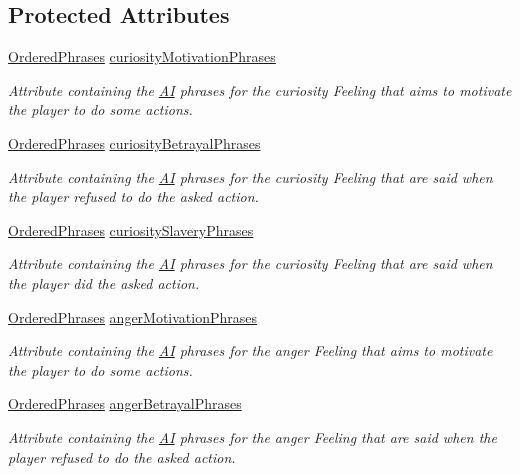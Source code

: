 \subsection*{Protected Attributes}
\begin{DoxyCompactItemize}
\item 
\hyperlink{a00016}{Ordered\-Phrases} \hyperlink{a00018_ad82ede6d0263d91e13511606f6696a18}{curiosity\-Motivation\-Phrases}
\begin{DoxyCompactList}\small\item\em Attribute containing the \hyperlink{a00001}{A\-I} phrases for the curiosity Feeling that aims to motivate the player to do some actions. \end{DoxyCompactList}\item 
\hyperlink{a00016}{Ordered\-Phrases} \hyperlink{a00018_a10f436b3727af6eedab39a382801306c}{curiosity\-Betrayal\-Phrases}
\begin{DoxyCompactList}\small\item\em Attribute containing the \hyperlink{a00001}{A\-I} phrases for the curiosity Feeling that are said when the player refused to do the asked action. \end{DoxyCompactList}\item 
\hyperlink{a00016}{Ordered\-Phrases} \hyperlink{a00018_a2e35ff33685cec980af1454e7f255d06}{curiosity\-Slavery\-Phrases}
\begin{DoxyCompactList}\small\item\em Attribute containing the \hyperlink{a00001}{A\-I} phrases for the curiosity Feeling that are said when the player did the asked action. \end{DoxyCompactList}\item 
\hyperlink{a00016}{Ordered\-Phrases} \hyperlink{a00018_a2fb3c3c2b96efbc4afee915d58967130}{anger\-Motivation\-Phrases}
\begin{DoxyCompactList}\small\item\em Attribute containing the \hyperlink{a00001}{A\-I} phrases for the anger Feeling that aims to motivate the player to do some actions. \end{DoxyCompactList}\item 
\hyperlink{a00016}{Ordered\-Phrases} \hyperlink{a00018_a69df7c3975018f12a43f29172bbc5789}{anger\-Betrayal\-Phrases}
\begin{DoxyCompactList}\small\item\em Attribute containing the \hyperlink{a00001}{A\-I} phrases for the anger Feeling that are said when the player refused to do the asked action. \end{DoxyCompactList}\item 

\end{DoxyCompactItemize}
